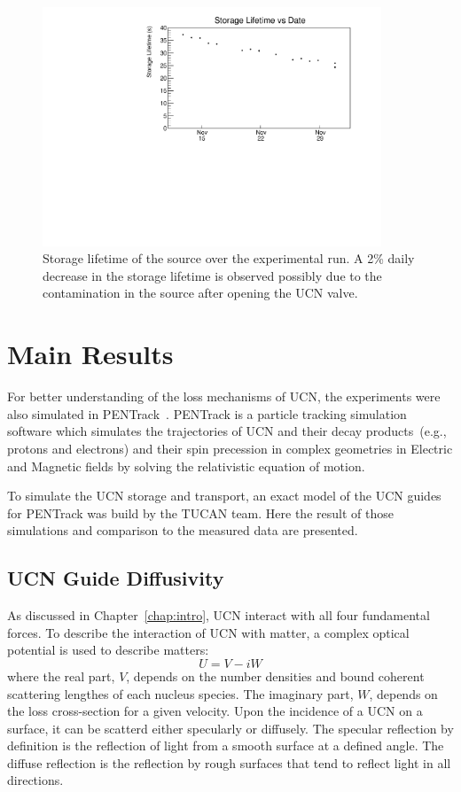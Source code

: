\begin{figure}[h!]
  \centering
  \includegraphics[width=0.9\textwidth]{storageLifetime_vs_time.pdf}
  \caption{Storage lifetime of the source over the experimental run. A
    2\% daily decrease in the storage lifetime is observed possibly
    due to the contamination in the source after opening the UCN
    valve.}
  \label{fig:storagelifetime_overall}
\end{figure}



\section{Main Results\label{sec:pentrack}}

For better understanding of the loss mechanisms of UCN, the
experiments were also simulated in
PENTrack~\cite{schreyer2017pentrack}. PENTrack is a particle tracking
simulation software which simulates the trajectories of UCN and their
decay products~(e.g., protons and electrons) and their spin precession
in complex geometries in Electric and Magnetic fields by solving the
relativistic equation of motion.

To simulate the UCN storage and transport, an exact model of the UCN
guides for PENTrack was build by the TUCAN team. Here the result of
those simulations and comparison to the measured data are presented.
\subsection{UCN Guide Diffusivity\label{sec:diffusivity}}
As discussed in Chapter~\ref{chap:intro}, UCN interact with all four
fundamental forces. To describe the interaction of UCN with matter, a
complex optical potential is used to describe matters:
\begin{equation}
  \label{eqn:fermipotential}
  U = V - iW
\end{equation}
where the real part, $V$, depends on the number densities and bound
coherent scattering lengthes of each nucleus species. The imaginary
part, $W$, depends on the loss cross-section for a given velocity.
Upon the incidence of a UCN on a surface, it can be scatterd either
specularly or diffusely. The specular reflection by definition is the
reflection of light from a smooth surface at a defined angle. The
diffuse reflection is the reflection by rough surfaces that tend to
reflect light in all directions.

